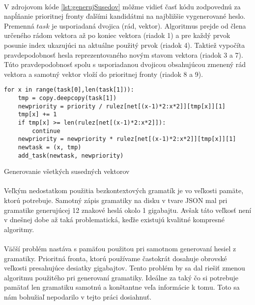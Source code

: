\paragraph{}
V zdrojovom kóde \ref{lst:generujSusedov} môžme vidieť časť kódu zodpovednú za napĺňanie prioritnej fronty ďalšími kandidátmi na najbližšie vygenerované heslo. Premenná \(task\) je usporiadaná dvojica (rád, vektor). Algoritmus prejde od člena určeného rádom vektora až po koniec vektora (riadok 1) a pre každý prvok posunie index ukazujúci na aktuálne použitý prvok (riadok 4). Taktiež vypočíta pravdepodobnosť hesla reprezentovaného novým stavom vektora (riadok 3 a 7). Túto pravdepodobnosť spolu s usporiadanou dvojicou obsahujúcou zmenený rád vektora a samotný vektor vloží do prioritnej fronty (riadok 8 a 9).

\begin{listing}
\begin{verbatim}
for x in range(task[0],len(task[1])):
	tmp = copy.deepcopy(task[1])
	newpriority = priority / rulez[net[(x-1)*2:x*2]][tmp[x]][1]
	tmp[x] += 1
	if tmp[x] >= len(rulez[net[(x-1)*2:x*2]]):
		continue
	newpriority = newpriority * rulez[net[(x-1)*2:x*2]][tmp[x]][1]
	newtask = (x, tmp)
	add_task(newtask, newpriority)
\end{verbatim}
\caption{Generovanie všetkých susedných vektorov}
\label{lst:generujSusedov}
\end{listing}

\paragraph{}
Veľkým nedostatkom použitia bezkontextových gramatík je vo veľkosti pamäte, ktorú potrebuje. Samotný zápis gramatiky na disku v tvare JSON mal pri gramatike generujúcej 12 znakové heslá okolo 1 gigabajtu. Avšak táto veľkosť není v dnešnej dobe až taká problematická, keďže existujú kvalitné kompresné algoritmy.

\paragraph{}
Väčší problém nastáva s pamäťou použitou pri samotnom generovaní hesiel z gramatiky. Prioritná fronta, ktorú používame častokrát dosahuje obrovské veľkosti presahujúce desiatky gigabajtov. Tento problém by sa dal riešiť zmenou algoritmu použitého pri generovaní gramatiky. Ideálne za taký čo si potrebuje pamätať len gramatiku samotnú a konštantne veľa informácie k tomu. Toto sa nám bohužiaľ nepodarilo v tejto práci dosiahnuť.

